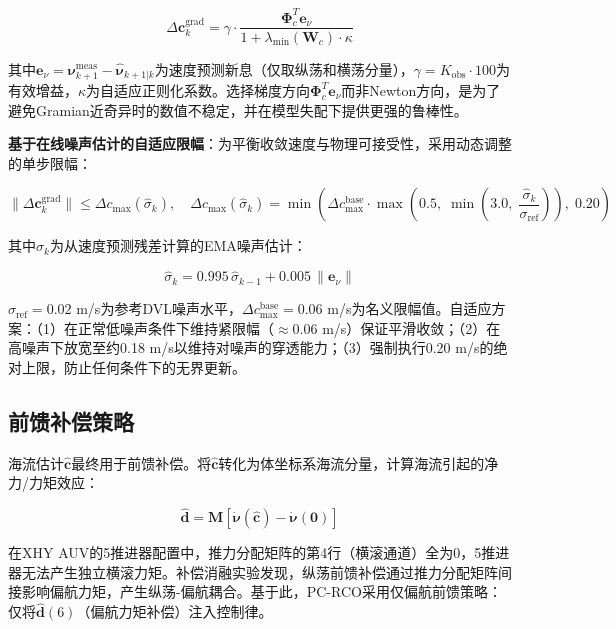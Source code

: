 \begin{equation}
    \Delta\bm{c}_k^{\text{grad}} = \gamma \cdot \frac{\bm{\Phi}_c^T \bm{e}_{\nu}}{1 + \lambda_{\min}(\bm{W}_c) \cdot \kappa}
    \label{eq:update}
\end{equation}

其中$\bm{e}_{\nu} = \bm{\nu}_{k+1}^{\text{meas}} - \hat{\bm{\nu}}_{k+1|k}$为速度预测新息（仅取纵荡和横荡分量），$\gamma = K_{\text{obs}} \cdot 100$为有效增益，$\kappa$为自适应正则化系数。选择梯度方向$\bm{\Phi}_c^T\bm{e}_{\nu}$而非Newton方向，是为了避免Gramian近奇异时的数值不稳定，并在模型失配下提供更强的鲁棒性。

\textbf{基于在线噪声估计的自适应限幅}：为平衡收敛速度与物理可接受性，采用动态调整的单步限幅：

\begin{equation}
    \|\Delta\bm{c}_k^{\text{grad}}\| \leq \Delta c_{\max}(\hat{\sigma}_k), \quad \Delta c_{\max}(\hat{\sigma}_k) = \min\left(\Delta c_{\max}^{\text{base}} \cdot \max\left(0.5,\; \min\left(3.0,\; \frac{\hat{\sigma}_k}{\sigma_{\text{ref}}}\right)\right),\; 0.20\right)
    \label{eq:adaptive_clamp}
\end{equation}

其中$\hat{\sigma}_k$为从速度预测残差计算的EMA噪声估计：

\begin{equation}
    \hat{\sigma}_k = 0.995\,\hat{\sigma}_{k-1} + 0.005\,\|\bm{e}_{\nu}\|
    \label{eq:noise_est}
\end{equation}

$\sigma_{\text{ref}}=0.02$ m/s为参考DVL噪声水平，$\Delta c_{\max}^{\text{base}}=0.06$ m/s为名义限幅值。自适应方案：（1）在正常低噪声条件下维持紧限幅（$\approx$0.06 m/s）保证平滑收敛；（2）在高噪声下放宽至约0.18 m/s以维持对噪声的穿透能力；（3）强制执行0.20 m/s的绝对上限，防止任何条件下的无界更新。

\subsection{前馈补偿策略}

海流估计$\hat{\bm{c}}$最终用于前馈补偿。将$\hat{\bm{c}}$转化为体坐标系海流分量，计算海流引起的净力/力矩效应：

\begin{equation}
    \hat{\bm{d}} = \bm{M}\left[\dot{\bm{\nu}}(\hat{\bm{c}}) - \dot{\bm{\nu}}(\bm{0})\right]
    \label{eq:feedforward}
\end{equation}

在XHY AUV的5推进器配置中，推力分配矩阵的第4行（横滚通道）全为0，5推进器无法产生独立横滚力矩。补偿消融实验发现，纵荡前馈补偿通过推力分配矩阵间接影响偏航力矩，产生纵荡-偏航耦合。基于此，PC-RCO采用仅偏航前馈策略：仅将$\hat{\bm{d}}(6)$（偏航力矩补偿）注入控制律。
